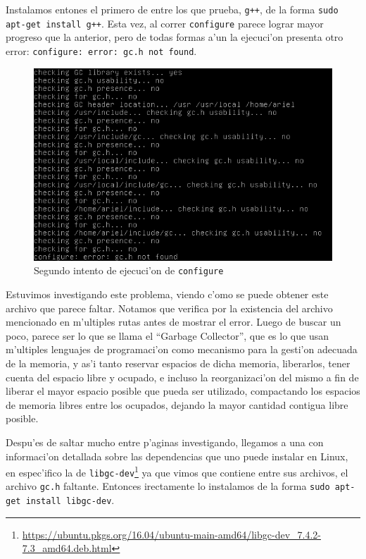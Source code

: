 \documentclass[11pt]{article}
\begin{document}
	Instalamos entones el primero de entre los que prueba, \texttt{g++}, de la forma \texttt{sudo apt-get install g++}. Esta vez, al correr \texttt{configure} parece lograr mayor progreso que la anterior, pero de todas formas a'un la ejecuci'on presenta otro error: \texttt{configure: error: gc.h not found}.
	
	\begin{figure}[H]
		\centering \captionsetup{justification=centering}
		\includegraphics[width=.8\linewidth]{Images/Compile_w3m/gc_missing}
		\caption{Segundo intento de ejecuci'on de \texttt{configure}}
		\label{fig:gc_missing}
	\end{figure}
	
	Estuvimos investigando este problema, viendo c'omo se puede obtener este archivo que parece faltar. Notamos que verifica por la existencia del archivo mencionado en m'ultiples rutas antes de mostrar el error. Luego de buscar un poco, parece ser lo que se llama el ``Garbage Collector'', que es lo que usan m'ultiples lenguajes de programaci'on como mecanismo para la gesti'on adecuada de la memoria, y as'i tanto reservar espacios de dicha memoria, liberarlos, tener cuenta del espacio libre y ocupado, e incluso la reorganizaci'on del mismo a fin de liberar el mayor espacio posible que pueda ser utilizado, compactando los espacios de memoria libres entre los ocupados, dejando la mayor cantidad contigua libre posible. 
	
	Despu'es de saltar mucho entre p'aginas investigando, llegamos a una con informaci'on detallada sobre las dependencias que uno puede instalar en Linux, en espec'ifico la de \texttt{libgc-dev}\footnote{\url{https://ubuntu.pkgs.org/16.04/ubuntu-main-amd64/libgc-dev_7.4.2-7.3_amd64.deb.html}} ya que vimos que contiene entre sus archivos, el archivo \texttt{gc.h} faltante. Entonces irectamente lo instalamos de la forma \texttt{sudo apt-get install libgc-dev}.
	
\end{document}
